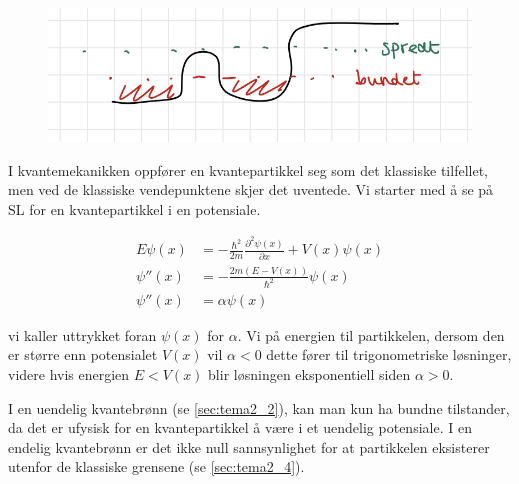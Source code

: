 \begin{figure}[!htb]
    \centering
    \includegraphics{Bilder/SamtaleTema2/Bundet og spredde/KombinerteTilstander.png}
    \caption{}
    \label{fig:kombinert}
\end{figure}

I kvantemekanikken oppfører en kvantepartikkel seg som det klassiske tilfellet, men ved de klassiske vendepunktene skjer det uventede. Vi starter med å se på SL for en kvantepartikkel i en potensiale.

\begin{equation}
    \label{eq:spredKvantte}
    \begin{split}
     E\psi(x)  &= -\frac{\hbar^2}{2m}\frac{\partial^2 \psi(x)}{\partial x} + V(x)\psi(x)\\
    \psi''(x) &= -\frac{2m(E-V(x))}{\hbar^2}\psi(x)\\
    \psi''(x) &= \alpha\psi(x)
    \end{split}
\end{equation}

vi kaller uttrykket foran $\psi(x)$ for $\alpha$. Vi på energien til partikkelen, dersom den er større enn potensialet $V(x)$ vil $\alpha < 0$ dette fører til trigonometriske løsninger, videre hvis energien $E < V(x)$ blir løsningen eksponentiell siden $\alpha > 0$.

I en uendelig kvantebrønn (se \autoref{sec:tema2_2}), kan man kun ha bundne tilstander, da det er ufysisk for en kvantepartikkel å være i et uendelig potensiale. I en endelig kvantebrønn er det ikke null sannsynlighet for at partikkelen eksisterer utenfor de klassiske grensene (se \autoref{sec:tema2_4}).


